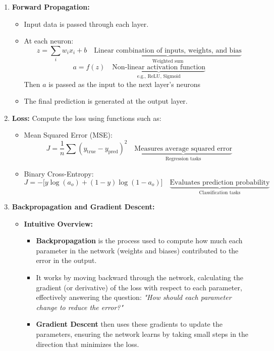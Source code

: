 \documentclass{article}
\begin{document}
\begin{enumerate}
        \item \textbf{Forward Propagation:}
        \begin{itemize}
            \item Input data is passed through each layer.
            \item At each neuron:
            \[
            z = \sum_{i} w_i x_i + b \quad \underbrace{\text{Linear combination of inputs, weights, and bias}}_{\text{Weighted sum}}
            \]
            \[
            a = f(z) \quad \underbrace{\text{Non-linear activation function}}_{\text{e.g., ReLU, Sigmoid}}
            \]
            Then $a$ is passed as the input to the next layer's neurons
            \item The final prediction is generated at the output layer.
        \end{itemize}
        
        \item \textbf{Loss:} Compute the loss using functions such as:
        \begin{itemize}
            \item Mean Squared Error (MSE):
            \[
            J = \frac{1}{n} \sum (y_{\text{true}} - y_{\text{pred}})^2 \quad \underbrace{\text{Measures average squared error}}_{\text{Regression tasks}}
            \]
            \item Binary Cross-Entropy:
            \[
            J = -\bigl[y \log(a_o) + (1-y) \log(1-a_o)\bigr] \quad \underbrace{\text{Evaluates prediction probability}}_{\text{Classification tasks}}
            \]
        \end{itemize}
        
    \item \textbf{Backpropagation and Gradient Descent:}
    \begin{itemize}
        \item \textbf{Intuitive Overview:}
            \begin{itemize}
                \item \textbf{Backpropagation} is the process used to compute how much each parameter in the network (weights and biases) contributed to the error in the output.
                \item It works by moving backward through the network, calculating the gradient (or derivative) of the loss with respect to each parameter, effectively answering the question: \textit{"How should each parameter change to reduce the error?"}
                \item \textbf{Gradient Descent} then uses these gradients to update the parameters, ensuring the network learns by taking small steps in the direction that minimizes the loss.
            \end{itemize}


\end{itemize}
\end{enumerate}
\end{document}
